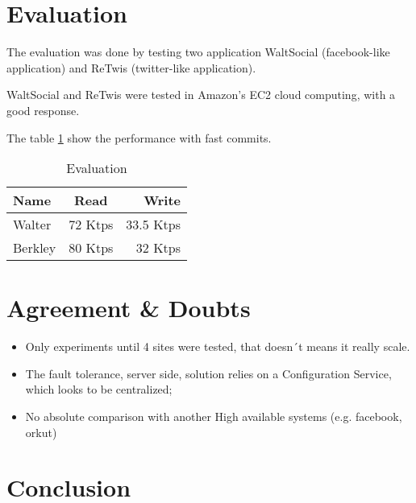 \documentclass[a4paper]{article}
\begin{document}
\section{Evaluation}

The evaluation was done by testing two application WaltSocial (facebook-like application) and ReTwis (twitter-like application).

WaltSocial and ReTwis were tested in Amazon's EC2 cloud computing, with a good response.

The table \ref{tab-evaluation} show the performance with fast commits. 

\begin{table}[center]
\begin{tabular}{ l c r }
	\hline
   Name & Read & Write \\
   \hline
   Walter & 72 Ktps & 33.5 Ktps \\
   Berkley & 80 Ktps & 32 Ktps \\
 \end{tabular}
 \caption{\label{tab-evaluation} Evaluation}
 \end{table}


\section{Agreement \& Doubts}

\begin{itemize}
\item Only experiments until 4 sites were tested, that doesn´t means it really scale.
\item The fault tolerance, server side, solution relies on a Configuration Service, which looks to be centralized;
\item No absolute comparison with another High available systems (e.g. facebook, orkut)
\end{itemize}

\section{Conclusion}
\end{document}
